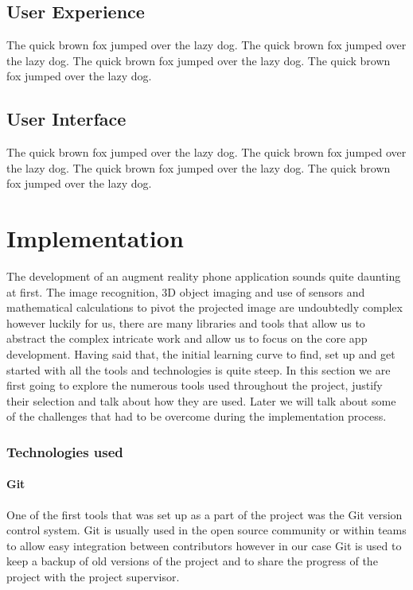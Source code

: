 \documentclass{l4proj}
\begin{document}
\section{User Experience}
The quick brown fox jumped over the lazy dog.
The quick brown fox jumped over the lazy dog.
The quick brown fox jumped over the lazy dog.
The quick brown fox jumped over the lazy dog.
\section{User Interface}
The quick brown fox jumped over the lazy dog.
The quick brown fox jumped over the lazy dog.
The quick brown fox jumped over the lazy dog.
The quick brown fox jumped over the lazy dog.

\chapter{Implementation}
The development of an augment reality phone application sounds quite daunting at first. The image recognition, 3D object imaging and use of sensors and mathematical calculations to pivot the projected image are undoubtedly complex however luckily for us, there are many libraries and tools that allow us to abstract the complex intricate work and allow us to focus on the core app development. Having said that, the initial learning curve to find, set up and get started with all the tools and technologies is quite steep. In this section we are first going to explore the numerous tools used throughout the project, justify their selection and talk about how they are used. Later we will talk about some of the challenges that had to be overcome during the implementation process.
\subsection{Technologies used}
\subsubsection{Git}
One of the first tools that was set up as a part of the project was the Git version control system. Git is usually used in the open source community or within teams to allow easy integration between contributors however in our case Git is used to keep a backup of old versions of the project and to share the progress of the project with the project supervisor. 
\end{document}
